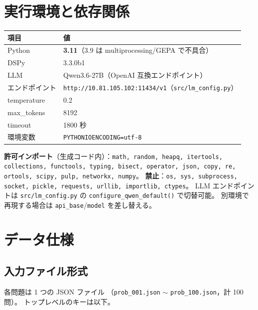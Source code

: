 \documentclass[uplatex,dvipdfmx,a4paper,11pt]{jsarticle}
\begin{document}
\section{実行環境と依存関係}\label{sec:env}

\begin{center}
\begin{tabular}{ll}
  \toprule
  項目 & 値 \\
  \midrule
  Python & \textbf{3.11}（3.9 は multiprocessing/GEPA で不具合） \\
  DSPy & 3.3.0b1 \\
  LLM & Qwen3.6-27B（OpenAI 互換エンドポイント） \\
  エンドポイント & \texttt{http://10.81.105.102:11434/v1}（\texttt{src/lm\_config.py}） \\
  temperature & 0.2 \\
  max\_tokens & 8192 \\
  timeout & 1800 秒 \\
  環境変数 & \texttt{PYTHONIOENCODING=utf-8} \\
  \bottomrule
\end{tabular}
\end{center}

\textbf{許可インポート}（生成コード内）：\texttt{math, random, heapq,
itertools, collections, functools, typing, bisect, operator, json,
copy, re, ortools, scipy, pulp, networkx, numpy}。
\textbf{禁止}：\texttt{os, sys, subprocess, socket, pickle, requests,
urllib, importlib, ctypes}。
LLM エンドポイントは \texttt{src/lm\_config.py} の
\texttt{configure\_qwen\_default()} で切替可能。
別環境で再現する場合は \texttt{api\_base}/\texttt{model} を差し替える。

\section{データ仕様}\label{sec:data}

\subsection{入力ファイル形式}

各問題は 1 つの JSON ファイル
（\texttt{prob\_001.json} $\sim$ \texttt{prob\_100.json}，計 100 問）。
トップレベルのキーは以下。
\end{document}
